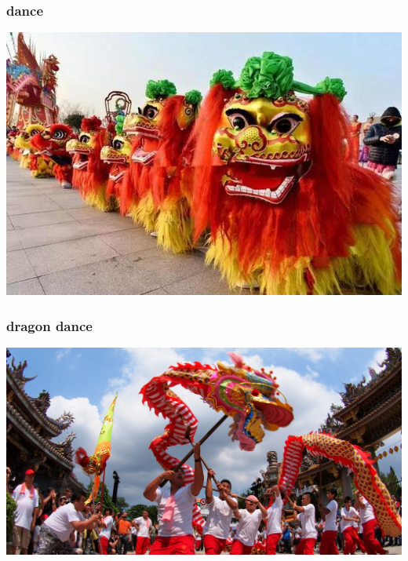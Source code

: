 \documentclass[17pt]{beamer}
\begin{document}
\begin{frame}
  \frametitle{ dance}
  \begin{center}
    \includegraphics[height=.75\textheight]{./images/wushi}
  \end{center}
\end{frame}

\begin{frame}
  \frametitle{dragon dance}
  \begin{center}
    \includegraphics[height=.6\textheight]{./images/wulong}
  \end{center}
\end{frame}

\end{document}
